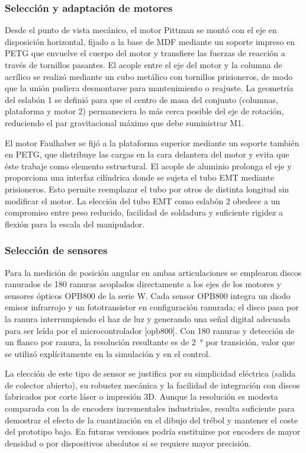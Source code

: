 \documentclass[11pt,a4paper]{article}
\begin{document}
\subsubsection{Selección y adaptación de motores}

Desde el punto de vista mecánico, el motor Pittman se montó con el eje en disposición horizontal, fijado a la base de MDF mediante un soporte impreso en PETG que envuelve el cuerpo del motor y transfiere las fuerzas de reacción a través de tornillos pasantes. El acople entre el eje del motor y la columna de acrílico se realizó mediante un cubo metálico con tornillos prisioneros, de modo que la unión pudiera desmontarse para mantenimiento o reajuste. La geometría del eslabón 1 se definió para que el centro de masa del conjunto (columnas, plataforma y motor 2) permaneciera lo más cerca posible del eje de rotación, reduciendo el par gravitacional máximo que debe suministrar M1.

El motor Faulhaber se fijó a la plataforma superior mediante un soporte también en PETG, que distribuye las cargas en la cara delantera del motor y evita que éste trabaje como elemento estructural. El acople de aluminio prolonga el eje y proporciona una interfaz cilíndrica donde se sujeta el tubo EMT mediante prisioneros. Esto permite reemplazar el tubo por otros de distinta longitud sin modificar el motor. La elección del tubo EMT como eslabón 2 obedece a un compromiso entre peso reducido, facilidad de soldadura y suficiente rigidez a flexión para la escala del manipulador.

\subsubsection{Selección de sensores}

Para la medición de posición angular en ambas articulaciones se emplearon discos ranurados de \SI{180}{} ranuras acoplados directamente a los ejes de los motores y sensores ópticos OPB800 de la serie W. Cada sensor OPB800 integra un diodo emisor infrarrojo y un fototransistor en configuración ranurada; el disco pasa por la ranura interrumpiendo el haz de luz y generando una señal digital adecuada para ser leída por el microcontrolador [opb800]. Con \SI{180}{} ranuras y detección de un flanco por ranura, la resolución resultante es de \SI{2}{\degree} por transición, valor que se utilizó explícitamente en la simulación y en el control.

La elección de este tipo de sensor se justifica por su simplicidad eléctrica (salida de colector abierto), su robustez mecánica y la facilidad de integración con discos fabricados por corte láser o impresión 3D. Aunque la resolución es modesta comparada con la de encoders incrementales industriales, resulta suficiente para demostrar el efecto de la cuantización en el dibujo del trébol y mantener el coste del prototipo bajo. En futuras versiones podría sustituirse por encoders de mayor densidad o por dispositivos absolutos si se requiere mayor precisión.
\end{document}
